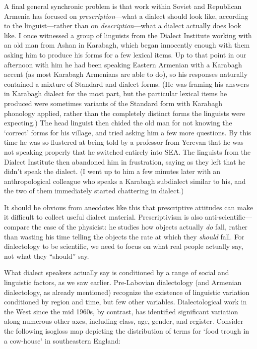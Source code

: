 A final general synchronic problem is that work within Soviet and Republican Armenia has focused on \textit{prescription}—what a dialect should look like, according to the linguist—rather than on \textit{description}—what a dialect actually does look like. I once witnessed a group of linguists from the Dialect Institute working with an old man from Ashan in Karabagh, which began innocently enough with them asking him to produce his forms for a few lexical items. Up to that point in our afternoon with him he had been speaking Eastern Armenian with a Karabagh accent (as most Karabagh Armenians are able to do), so his responses naturally contained a mixture of Standard and dialect forms. (He was framing his answers in Karabagh dialect for the most part, but the particular lexical items he produced were sometimes variants of the Standard form with Karabagh phonology applied, rather than the completely distinct forms the linguists were expecting.) The head linguist then chided the old man for not knowing the ‘correct’ forms for his village, and tried asking him a few more questions. By this time he was so flustered at being told by a professor from Yerevan that he was not speaking properly that he switched entirely into SEA. The linguists from the Dialect Institute then abandoned him in frustration, saying as they left that he didn’t speak the dialect. (I went up to him a few minutes later with an anthropological colleague who speaks a Karabagh subdialect similar to his, and the two of them immediately started chattering in dialect.)

It should be obvious from anecdotes like this that prescriptive attitudes can make it difficult to collect useful dialect material. Prescriptivism is also anti-scientific—compare the case of the physicist: he studies how objects actually \textit{do} fall, rather than wasting his time telling the objects the rate at which they \textit{should} fall. For dialectology to be scientific, we need to focus on what real people actually say, not what they “should” say.


What dialect speakers actually say is conditioned by a range of social and linguistic factors, as we saw earlier. Pre-Labovian dialectology (and Armenian dialectology, as already mentioned) recognize the existence of linguistic variation conditioned by region and time, but few other variables. Dialectological work in the West since the mid 1960s, by contrast, has identified significant variation along numerous other axes, including class, age, gender, and register. Consider the following isogloss map depicting the distribution of terms for ‘food trough in a cow-house’ in southeastern England:

